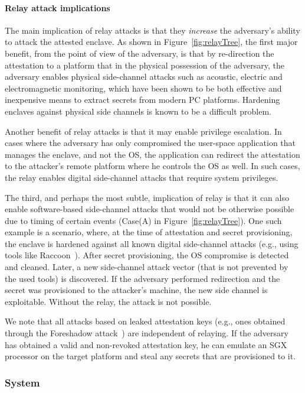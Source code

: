 \paragraph{Relay attack implications}
The main implication of relay attacks is that they \emph{increase} the adversary's ability to attack the attested enclave. As shown in Figure~\ref{fig:relayTree}, the first major benefit, from the point of view of the adversary, is that by re-direction the attestation to a platform that in the physical possession of the adversary, the adversary enables physical side-channel attacks such as acoustic, electric and electromagnetic monitoring, which have been shown to be both effective and inexpensive means to extract secrets from modern PC platforms. Hardening enclaves against physical side channels is known to be a difficult problem. 

Another benefit of relay attacks is that it may enable privilege escalation. In cases where the adversary has only compromised the user-space application that manages the enclave, and not the OS, the application can redirect the attestation to the attacker's remote platform where he controls the OS as well. In such cases, the relay enables digital side-channel attacks that require system privileges.

The third, and perhaps the most subtle, implication of relay is that it can also enable software-based side-channel attacks that would not be otherwise possible due to timing of certain events (Case(A) in Figure~\ref{fig:relayTree}). One such example is a scenario, where, at the time of attestation and secret provisioning, the enclave is hardened against all known digital side-channel attacks (e.g., using tools like Raccoon~\cite{raccoon}). After secret provisioning, the OS compromise is detected and cleaned. Later, a new side-channel attack vector (that is not prevented by the used tools) is discovered. If the adversary performed redirection and the secret was provisioned to the attacker's machine, the new side channel is exploitable. Without the relay, the attack is not possible.

We note that all attacks based on leaked attestation keys (e.g., ones obtained through the Foreshadow attack~\cite{foreshadow-usenix18}) are independent of relaying. If the adversary has obtained a valid and non-revoked attestation key, he can emulate an SGX processor on the target platform and steal any secrets that are provisioned to it.


\subsubsection*{\proximitee System}

